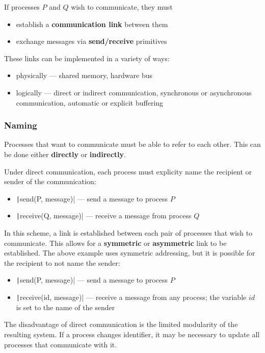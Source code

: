 \documentclass{article}
\begin{document}
If processes \(P\) and \(Q\) wish to communicate, they must
\begin{itemize}
    \item establish a \textbf{communication link} between them
    \item exchange messages via \textbf{send/receive} primitives
\end{itemize}
These links can be implemented in a variety of ways:
\begin{itemize}
    \item physically --- shared memory, hardware bus
    \item logically --- direct or indirect communication, synchronous
          or asynchronous communication, automatic or explicit
          buffering
\end{itemize}
\subsubsection{Naming}
Processes that want to communicate must be able to refer to each other.
This can be done either \textbf{directly} or \textbf{indirectly}.

Under direct communication, each process must explicity name the
recipient or sender of the communication:
\begin{itemize}
    \item \texttt|send(P, message)| --- send a message to
          process \(P\)
    \item \texttt|receive(Q, message)| --- receive a message
          from process \(Q\)
\end{itemize}
In this scheme, a link is established between each pair of processes
that wish to communicate. This allows for a \textbf{symmetric} or
\textbf{asymmetric} link to be established. The above example uses
symmetric addressing, but it is possible for the recipient to not
name the sender:
\begin{itemize}
    \item \texttt|send(P, message)| --- send a message to
          process \(P\)
    \item \texttt|receive(id, message)| --- receive a message
          from any process; the variable \(id\) is set to the name of
          the sender
\end{itemize}
The disadvantage of direct communication is the limited modularity of
the resulting system. If a process changes identifier, it may be
necessary to update all processes that communicate with it.
\end{document}
